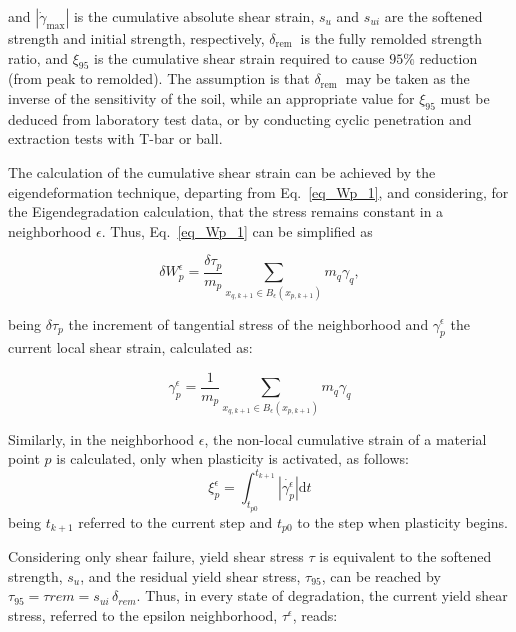 \documentclass[applsci,journal,article,submit,moreauthors,pdftex]{Definitions/mdpi}
\begin{document}
and $\left|\dot{\gamma}_{\max }\right|$ is the cumulative absolute shear strain, $s_{u}$ and $s_{u i}$ are the softened strength and initial strength, respectively, $\delta_{\text {rem }}$ is the fully remolded strength ratio, and $\xi_{95}$ is the cumulative shear strain required to cause $95 \%$ reduction (from peak to remolded). The assumption is that $\delta_{\text {rem }}$ may be taken as the inverse of the sensitivity of the soil, while an appropriate value for $\xi_{95}$ must be deduced from laboratory test data, or by conducting cyclic penetration and extraction tests with T-bar or ball.

The calculation of the cumulative shear strain can be achieved by the eigendeformation technique, departing from Eq.~\eqref{eq_Wp_1}, and considering, for the Eigendegradation calculation, that the stress remains constant in a neighborhood $\epsilon$. Thus, Eq.~\eqref{eq_Wp_1} can be simplified as

\begin{equation}\label{eq_Wp_4}
\delta W^\epsilon_{p}=\frac{\delta \tau_p} {m_{p}} \sum_{x_{q,k+1}\in B_\epsilon (x_{p,k+1})} m_q \gamma_{q},
\end{equation}

being $\delta \tau_p$ the increment of tangential stress of the neighborhood and $\gamma^{\epsilon}_{p}$ the current local shear strain, calculated as:

\begin{equation}\label{eq_Wp_5}
\gamma^{\epsilon}_{p}=\frac{1}{m_{p}}\sum_{x_{q,k+1}\in B_\epsilon (x_{p,k+1})}m_q \gamma_{q}
\end{equation}

Similarly, in the neighborhood $\epsilon$, the non-local cumulative strain of a material point $p$ is calculated, only when plasticity is activated, as follows:
\begin{equation}\label{eq18}
\xi^{\epsilon}_{p}=\int^{t_{k+1}}_{t_{p0}}\left|\dot{\gamma^{\epsilon}_{p}}\right| \mathrm{d} t
\end{equation}
being $t_{k+1}$ referred to the current step and $t_{p0}$ to the step when plasticity begins. 

Considering only shear failure, yield shear stress $\tau$ is equivalent to the softened strength, $s_u$, and the residual yield shear stress, $\tau_{95}$, can be reached by $\tau_{95}=\tau{rem}=s_{ui} \, \delta_{rem}$. Thus, in every state of degradation, the current yield shear stress, referred to the epsilon neighborhood, $\tau^{\epsilon}$, reads:
\end{document}
